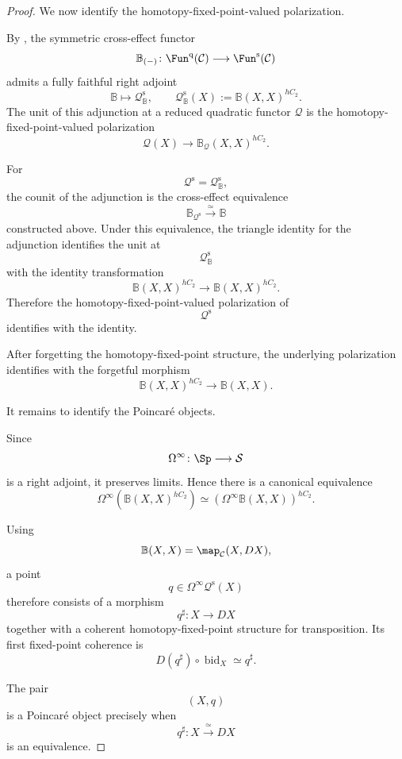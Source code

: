 \begin{proof}
We now identify the homotopy-fixed-point-valued polarization.

By
\cite[Corollary~1.3.6]{CalmesDottoHarpazEtAl},
the symmetric cross-effect functor
\[
    \mathbb B_{(-)}
    \colon
    \Fun^{\mathrm q}(\mathcal C)
    \longrightarrow
    \Fun^{\mathrm s}(\mathcal C)
\]
admits a fully faithful right adjoint
\[
    \mathbb B
    \longmapsto
    \mathcal Q_{\mathbb B}^{\mathrm s},
    \qquad
    \mathcal Q_{\mathbb B}^{\mathrm s}(X)
    :=
    \mathbb B(X,X)^{hC_2}.
\]
The unit of this adjunction at a reduced quadratic functor $\mathcal Q$ is
the homotopy-fixed-point-valued polarization
\[
    \mathcal Q(X)
    \longrightarrow
    \mathbb B_{\mathcal Q}(X,X)^{hC_2}.
\]

For
\[
    \mathcal Q^{\mathrm s}
    =
    \mathcal Q_{\mathbb B}^{\mathrm s},
\]
the counit of the adjunction is the cross-effect equivalence
\[
    \mathbb B_{\mathcal Q^{\mathrm s}}
    \xrightarrow{\;\simeq\;}
    \mathbb B
\]
constructed above. Under this equivalence, the triangle identity for the
adjunction identifies the unit at
\[
    \mathcal Q_{\mathbb B}^{\mathrm s}
\]
with the identity transformation
\[
    \mathbb B(X,X)^{hC_2}
    \longrightarrow
    \mathbb B(X,X)^{hC_2}.
\]
Therefore the homotopy-fixed-point-valued polarization of
\[
    \mathcal Q^{\mathrm s}
\]
identifies with the identity.

After forgetting the homotopy-fixed-point structure, the underlying
polarization identifies with the forgetful morphism
\[
    \mathbb B(X,X)^{hC_2}
    \longrightarrow
    \mathbb B(X,X).
\]

It remains to identify the Poincaré objects.

Since
\[
    \Omega^\infty
    \colon
    \Sp
    \longrightarrow
    \mathcal S
\]
is a right adjoint, it preserves limits. Hence there is a canonical
equivalence
\[
    \Omega^\infty
    \left(
        \mathbb B(X,X)^{hC_2}
    \right)
    \simeq
    \left(
        \Omega^\infty\mathbb B(X,X)
    \right)^{hC_2}.
\]

Using
\[
    \mathbb B(X,X)
    =
    \map_{\mathcal C}(X,DX),
\]
a point
\[
    q
    \in
    \Omega^\infty\mathcal Q^{\mathrm s}(X)
\]
therefore consists of a morphism
\[
    q^\sharp
    \colon
    X
    \longrightarrow
    DX
\]
together with a coherent homotopy-fixed-point structure for
transposition. Its first fixed-point coherence is
\[
    D(q^\sharp)
    \circ
    \operatorname{bid}_X
    \simeq
    q^\sharp.
\]

The pair
\[
    (X,q)
\]
is a Poincaré object precisely when
\[
    q^\sharp
    \colon
    X
    \xrightarrow{\;\simeq\;}
    DX
\]
is an equivalence.


\end{proof}
